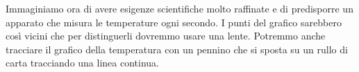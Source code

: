 Immaginiamo ora di avere esigenze scientifiche molto raffinate e di 
predisporre un apparato che misura le temperature ogni secondo. 
I punti del grafico sarebbero così vicini che per distinguerli dovremmo 
usare una lente.
Potremmo anche tracciare il grafico della temperatura con un pennino che si 
sposta su un rullo di carta tracciando una linea continua.
% 
% 


